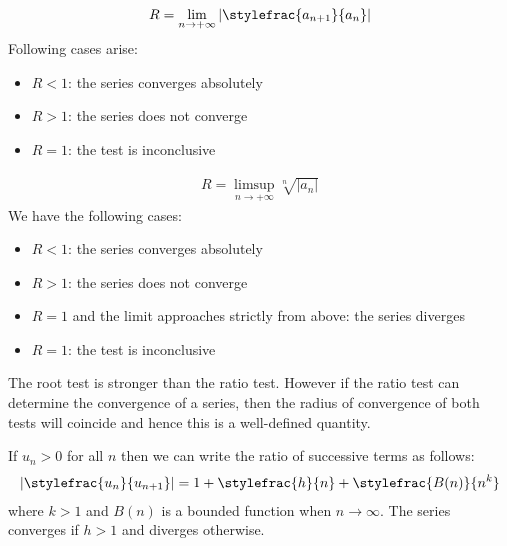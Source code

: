     \begin{method}
        \begin{gather}
            R = \lim_{n\rightarrow+\infty}\left|\stylefrac{a_{n+1}}{a_n}\right|
        \end{gather}
        Following cases arise:
        \begin{itemize}
            \item $R < 1$: the series converges absolutely
            \item $R > 1$: the series does not converge
            \item $R = 1$: the test is inconclusive
        \end{itemize}
    \end{method}

    \begin{method}
        \begin{gather}
            R = \limsup_{n\rightarrow+\infty}\sqrt[n]{|a_n|}
        \end{gather}
        We have the following cases:
        \begin{itemize}
            \item $R < 1$: the series converges absolutely
            \item $R > 1$: the series does not converge
            \item $R = 1$ and the limit approaches strictly from above: the series diverges
            \item $R = 1$: the test is inconclusive
        \end{itemize}
    \end{method}
    \begin{remark}
        The root test is stronger than the ratio test. However if the ratio test can determine the convergence of a series, then the radius of convergence of both tests will coincide and hence this is a well-defined quantity.
    \end{remark}

    \begin{method}
        If $u_n>0$ for all $n$ then we can write the ratio of successive terms as follows:
        \begin{gather}
            \label{series:gauss_test}
            \left|\stylefrac{u_n}{u_{n+1}}\right| = 1 + \stylefrac{h}{n} + \stylefrac{B(n)}{n^k}
        \end{gather}
        where $k > 1$ and $B(n)$ is a bounded function when $n\rightarrow\infty$. The series converges if $h > 1$ and diverges otherwise.
    \end{method}

